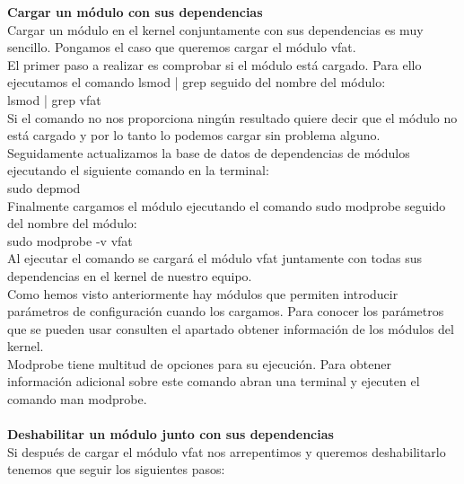 \documentclass[11pt, a4paper]{report}
\begin{document}
\textbf{Cargar un módulo con sus dependencias} \\

Cargar un módulo en el kernel conjuntamente con sus dependencias es muy
sencillo. Pongamos el caso que queremos cargar el módulo vfat.\\

El primer paso a realizar es comprobar si el módulo está cargado. Para
ello ejecutamos el comando lsmod | grep seguido del nombre del módulo:\\

lsmod | grep vfat \\

Si el comando no nos proporciona ningún resultado quiere decir que el
módulo no está cargado y por lo tanto lo podemos cargar sin problema
alguno. \\

Seguidamente actualizamos la base de datos de dependencias de módulos
ejecutando el siguiente comando en la terminal: \\

sudo depmod \\

Finalmente cargamos el módulo ejecutando el comando sudo modprobe seguido
del nombre del módulo: \\

sudo modprobe -v vfat \\

Al ejecutar el comando se cargará el módulo vfat juntamente con todas sus
dependencias en el kernel de nuestro equipo. \\

Como hemos visto anteriormente hay módulos que permiten introducir
parámetros de configuración cuando los cargamos. Para conocer los
parámetros que se pueden usar consulten el apartado obtener información
de los módulos del kernel. \\

Modprobe tiene multitud de opciones para su ejecución. Para obtener
información adicional sobre este comando abran una terminal y ejecuten
el comando man modprobe.\\
\\
\textbf{Deshabilitar un módulo junto con sus dependencias} \\

Si después de cargar el módulo vfat nos arrepentimos y queremos
deshabilitarlo tenemos que seguir los siguientes pasos: \\
\end{document}
